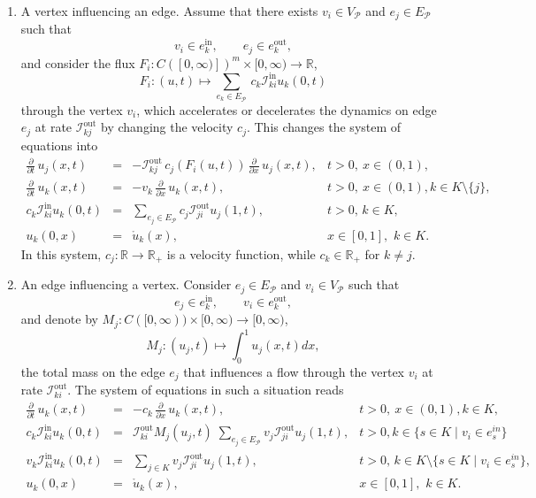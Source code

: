 \documentclass[a4paper,12pt]{article}
\theoremstyle{definition}
\theoremstyle{remark}
\newcommand{\mP}{\mathcal{P}}
\newcommand{\tin}{\mathrm{in}}
\newcommand{\out}{\mathrm{out}}
\newcommand{\inci}{\mathcal{I}^{\tin}}
\newcommand{\inco}{\mathcal{I}^{\out}}
\begin{document}
\begin{enumerate}
\item  A vertex influencing an edge. Assume that there exists $v_i\in V_{\mP}$ and $e_j\in E_{\mP}$ such that 
\begin{equation*}
v_i\in e_k^{\textrm{in}}, \qquad e_j\in e_k^{\textrm{out}}, 
\end{equation*}
and consider the flux $F_i:C([0,\infty)])^m\times [0,\infty)\to \mathbb{R}$, 
$$F_i:(u,t)\mapsto \sum_{e_k\in E_{\mP}}\, c_k\inci_{ki} u_{k}(0,t)$$ through the vertex $v_i$, which accelerates or decelerates the dynamics on edge $e_j$ at rate $\inco_{kj}$ by changing the velocity $c_j$. This changes the system of equations into 
\begin{equation*}
\begin{array}{rcll}
\frac{\partial}{\partial t}\, u_j(x,t) &=& - \inco_{kj}\, c_j\left(F_i(u,t)\right)\,\frac{\partial}{\partial x}\, u_j(x,t)
,&t >0,\ x\in(0,1),\\[.1cm]
\frac{\partial}{\partial t}\, u_k(x,t) &=& -v_k\,\frac{\partial}{\partial x}\, u_k(x,t)
,&t >0,\ x\in(0,1), k\in K\setminus\{j\},\\[.1cm]
c_k\inci_{ki} u_{k}(0,t)&=&\sum_{e_j\in E_{\mP}}c_j\inco_{ji}u_{j}(1,t),& t >0,\,k\in K,
\\[.1cm]
u_k(0,x)&=& \mathring{u}_k(x), &x\in\left[0,1\right],\,\,k\in K.
\end{array}
\end{equation*}
In this system, $c_j:\mathbb{R}\to \mathbb{R}_+$ is a velocity function, while $c_k\in \mathbb{R}_+$ for $k\neq j$.
\item An edge influencing a vertex. Consider $e_j\in E_{\mP}$ and $v_i\in V_{\mP}$ such that 
\begin{equation*}
e_j\in e_k^{\textrm{in}}, \qquad v_i \in e_k^{\textrm{out}},
\end{equation*}
and denote by $M_j:C([0,\infty))\times [0,\infty) \to [0,\infty)$,
\begin{equation}\label{eq:edge_mass}
M_j:(u_j,t)\mapsto \int_{0}^1u_j(x,t)dx,
\end{equation}
the total mass on the edge $e_j$ that influences a flow through the vertex $v_i$ at rate $\inco_{ki}$.
The system of equations in such a situation reads
\begin{equation*}
\begin{array}{rcll}
\frac{\partial}{\partial t}\, u_k(x,t) &=& -c_k\,\frac{\partial}{\partial x}\, u_k(x,t)
,&t >0,\ x\in(0,1), k\in K,\\[.1cm]
c_k\inci_{ki} u_{k}(0,t)&=&\inco_{ki}M_j(u_j,t)\; \sum_{e_j\in E_{\mP}}v_j\inco_{ji}u_{j}(1,t),& t >0, k\in \{s\in K\;|\;v_i\in e_s^{in}\}
\\[.1cm]
v_k\inci_{ki} u_{k}(0,t)&=&\sum_{j\in K}v_j\inco_{ji}u_{j}(1,t),& t >0,\,k\in K\setminus \{s\in K\;|\;v_i\in e_s^{in}\},
\\[.1cm]
u_k(0,x)&=& \mathring{u}_k(x), &x\in\left[0,1\right],\,\,k\in K.
\end{array}
\end{equation*}



\end{enumerate}
\end{document}
